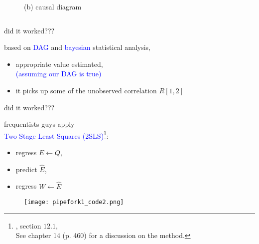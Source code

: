 \begin{frame}
\begin{columns}
\begin{column}{0.5\textwidth}
\begin{figure}
				\caption*{(b) causal diagram}
			\end{figure}
		\end{column}
	\end{columns}
\end{frame}
%
%
\begin{lhframe}[rhgraphic={\texttt{[image: pipefork1\_reg3.png]}}]
	{did it worked???}
	
	based on \textcolor{blue}{DAG} and \textcolor{blue}{bayesian} statistical analysis,
	\begin{itemize}
		\item appropriate value estimated, \\
		{\small \textcolor{blue}{(assuming our DAG is true)} }
		\item it picks up some of the unobserved correlation $R[1,2]$
	\end{itemize}
\end{lhframe}
%
%
\begin{lhframe}[rhgraphic={\texttt{[image: pipefork1\_reg4.png]}}]
	{did it worked???}
	
	frequentists guys apply \\
	\textcolor{blue}{Two Stage Least Squares (2SLS)}\footnote{\citet{Hanck_et_al_2021}, section $12.1$, \\
		See \citet{McElreath_2020} chapter 14 (p. 460) for a discussion on the method.}:
	\begin{itemize}
		\item regress $E \leftarrow Q$, 
		\item predict $\hat{E}$,
		\item regress $W \leftarrow \hat{E}$
	\end{itemize}
	\begin{figure}
		\texttt{[image: pipefork1\_code2.png]}
	\end{figure}
\end{lhframe}

